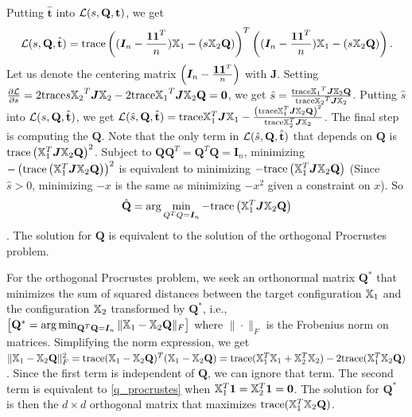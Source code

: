 \documentclass[12pt,oneside,final]{thesis}\usepackage[]{graphicx}\usepackage[]{color}
\begin{document}
Putting $\hat{\mathbf{t}}$ into  $\mathcal{L}(s,\mathbf{Q},{\mathbf{t}})$, we get 
\[\mathcal{L}(s,\mathbf{Q},\hat{\mathbf{t}}) = \textup{trace} \left((\bm{I}_n- \frac{\mbox{{\bf 1}} {\ensuremath{\mbox{{\bf 1}}}} ^T}{n}){\mathbb{X}}_1 - (s{\mathbb{X}}_2\mathbf{Q} )\right)^T \left((\bm{I}_n- \frac{\mbox{{\bf 1}} {\ensuremath{\mbox{{\bf 1}}}} ^T}{n}){\mathbb{X}}_1 - (s{\mathbb{X}}_2\mathbf{Q})\right).\]
Let us denote the centering matrix $\left(\bm{I}_n- \frac{\mbox{{\bf 1}} {\ensuremath{\mbox{{\bf 1}}}} ^T}{n}\right)$  with $\bm{J}$. 
Setting  $\frac{\partial \mathcal{L}}{\partial s}=2 \textup{trace} {s{{\mathbb{X}}_2}^T  \bm{J} {{\mathbb{X}}_2}}-2 \textup{trace} {  {{\mathbb{X}}_1}^T \bm{J} {\mathbb{X}}_2\mathbf{Q}}=\bm{0}$,
we get $\hat{s}=\frac{ \textup{trace} {  {{\mathbb{X}}_1}^T \bm{J} {\mathbb{X}}_2\mathbf{Q}}}{\textup{trace} {{{\mathbb{X}}_2}^T  \bm{J} {{\mathbb{X}}_2}}}$.
Putting $\hat{s}$ into $\mathcal{L}(s,\mathbf{Q},\hat{\mathbf{t}})$, we get
$\mathcal{L}(\hat{s},\mathbf{Q},\hat{\mathbf{t}}) = 
\textup{trace}{{\mathbb{X}}_1^T \bm{J} {\mathbb{X}}_1}- 
\frac{ \left({ \textup{trace}{  {\mathbb{X}}_1^T \bm{J} {\mathbb{X}}_2\mathbf{Q} }}\right)^2}
{\textup{trace}{{\mathbb{X}}_2^T \bm{J} {\mathbb{X}}_2}} $.
The final step is computing the $\mathbf{Q}$. 
Note that the only term in $\mathcal{L}(\hat{s},\mathbf{Q},\hat{\mathbf{t}})$  that depends on $\mathbf{Q}$ is  $\textup{trace} \left( {\mathbb{X}}_1^T \bm{J} {\mathbb{X}}_2\mathbf{Q}\right)^2$. 
Subject to $\mathbf{Q}\mathbf{Q}^T=\mathbf{Q}^T\mathbf{Q}=\bm{I}_n$, minimizing   $- \left( \textup{trace} \left( {\mathbb{X}}_1^T \bm{J} {\mathbb{X}}_2\mathbf{Q}\right)\right)^2$ is equivalent to minimizing  $-\textup{trace} \left( {\mathbb{X}}_1^T \bm{J} {\mathbb{X}}_2\mathbf{Q}\right)$ (Since $\hat{s}>0$, minimizing $-x$ is the same as minimizing $-x^2$ given a constraint on $x$). So  \[\hat{\mathbf{Q}}=\arg\min_{Q^TQ = \bm{I}_n}{-\textup{trace} \left( {\mathbb{X}}_1^T \bm{J} {\mathbb{X}}_2\mathbf{Q}\right)} \label{q_procrustes}\]. The solution for $\mathbf{Q}$ is equivalent to the solution of the orthogonal Procrustes problem.

For the orthogonal Procrustes problem, we seek  an orthonormal matrix $\mathbf{Q}^*$ that minimizes the sum of squared distances between the  target configuration ${\mathbb{X}}_1$ and  the configuration ${\mathbb{X}}_2$ transformed by $\mathbf{Q}^*$, i.e.,
 $\left[\mathbf{Q}^* = \arg\min_{\mathbf{Q}^T\mathbf{Q} = \bm{I}_n} \|{\mathbb{X}}_1 - {\mathbb{X}}_2\mathbf{Q}\|_F  \right] $
 where $\|\cdot\|_F$ is the Frobenius norm on matrices.
Simplifying the norm expression, we get $\|{\mathbb{X}}_1 - {\mathbb{X}}_2\mathbf{Q}\|_F^2 = \textup{trace} {({\mathbb{X}}_1 - {\mathbb{X}}_2\mathbf{Q})^T({\mathbb{X}}_1 - {\mathbb{X}}_2\mathbf{Q})}= \textup{trace} {({\mathbb{X}}_1^T{\mathbb{X}}_1 + {\mathbb{X}}_2^T{\mathbb{X}}_2)} - 2\textup{trace}{ ({\mathbb{X}}_1^T {\mathbb{X}}_2\mathbf{Q})}$. Since the first term is independent of $\mathbf{Q}$, we can ignore that term. The second term  is equivalent to \eqref{q_procrustes} when  ${\mathbb{X}}_1^T\mbox{{\bf 1}} =  {\mathbb{X}}_2^T\mbox{{\bf 1}}=\bm{0}$. The solution for $\mathbf{Q}^*$ is then the  $d\times d$ orthogonal matrix that maximizes $\textup{trace}{ ({\mathbb{X}}_1^T {\mathbb{X}}_2\mathbf{Q})}$.
\end{document}
